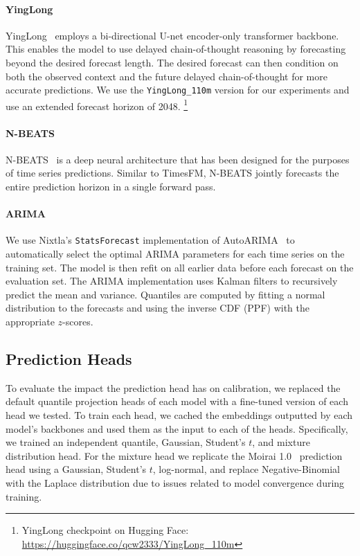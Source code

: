 \documentclass{article}
\begin{document}
\paragraph{YingLong}
YingLong~\citep{yinglong} employs a bi-directional U-net encoder-only transformer backbone.
This enables the model to use delayed chain-of-thought reasoning by forecasting beyond the desired forecast length.
The desired forecast can then condition on both the observed context and the future delayed chain-of-thought for more accurate predictions.
We use the \texttt{YingLong\_110m} version for our experiments and use an extended forecast horizon of 2048. \footnote{YingLong checkpoint on Hugging Face: \url{https://huggingface.co/qcw2333/YingLong_110m}}

\paragraph{N-BEATS} 
N-BEATS~\citep{nbeats} is a deep neural architecture that has been designed for the purposes of time series predictions. 
Similar to TimesFM, N-BEATS jointly forecasts the entire prediction horizon in a single forward pass. 

\paragraph{ARIMA} 
We use Nixtla's \texttt{StatsForecast} implementation of AutoARIMA~\citep{autoarima} to automatically select the optimal ARIMA parameters for each time series on the training set. 
The model is then refit on all earlier data before each forecast on the evaluation set. 
The ARIMA implementation uses Kalman filters to recursively predict the mean and variance. 
Quantiles are computed by fitting a normal distribution to the forecasts and using the inverse CDF (PPF) with the appropriate $z$-scores.

\subsection{Prediction Heads}\label{sec:appendix:pred_heads}
To evaluate the impact the prediction head has on calibration, we replaced the default quantile projection heads of each model with a fine-tuned version of each head we tested.
To train each head, we cached the embeddings outputted by each model's backbones and used them as the input to each of the heads.
Specifically, we trained an independent quantile, Gaussian, Student's $t$, and mixture distribution head.
For the mixture head we replicate the Moirai 1.0~\citep{moirai} prediction head using a Gaussian, Student’s $t$, log-normal, and replace Negative-Binomial with the Laplace distribution due to issues related to model convergence during training.
\end{document}
